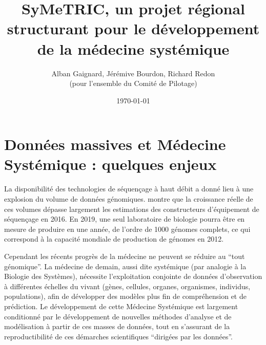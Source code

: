 \documentclass[a4paper,10pt]{article}
\title{\bf SyMeTRIC, un projet régional structurant pour le développement de la médecine systémique}
\author{
  Alban Gaignard, Jérémive Bourdon, Richard Redon \\(pour l'ensemble du Comité de Pilotage)
}
\date{\today}
\theoremstyle{definition}
\begin{document}
\parindent=0pt
\thispagestyle{empty}
\renewcommand{\labelitemi}{$\bullet$}
\renewcommand{\labelitemii}{$\circ$}
\renewcommand{\labelitemiii}{$\diamond$}


\maketitle 


\section{Données massives et Médecine Systémique : quelques enjeux} 

La disponibilité des technologies de séquençage à haut débit a donné lieu à une explosion du volume de données génomiques. \cite{bigdata} montre que la croissance réelle de ces volumes dépasse largement les estimations des constructeurs d'équipement de séquençage en 2016. En 2019, une seul laboratoire de biologie pourra être en mesure de produire en une année, de l'ordre de 1000 génomes complets, ce qui correspond à la capacité mondiale de production de génomes en 2012. 

Cependant les récents progrès de la médecine ne peuvent se réduire au ``tout génomique''. La médecine de demain, aussi dite systémique (par analogie à la Biologie des Systèmes), nécessite l'exploitation conjointe de données d'observation à différentes échelles du vivant (gènes, cellules, organes, organismes, individus, populations), afin de développer des modèles plus fin de compréhension et de prédiction. Le développement de cette Médecine Systémique est largement conditionné par le développement de nouvelles méthodes d'analyse et de modélisation à partir de ces masses de données, tout en s'assurant de la reproductibilité de ces démarches scientifiques ``dirigées par les données''. 
\end{document}
